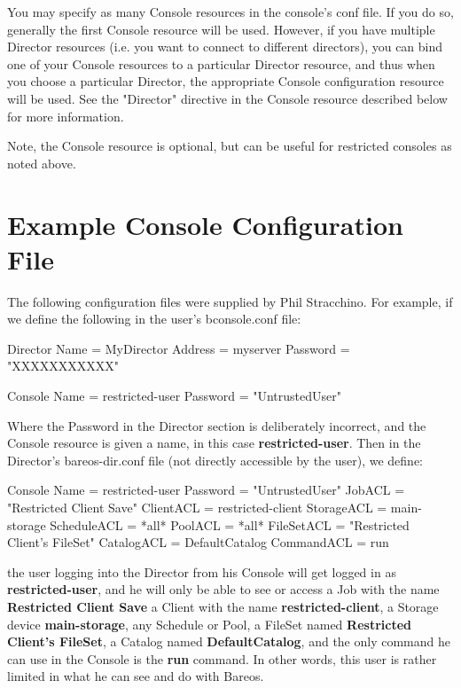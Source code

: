 You may specify as many Console resources in the console's conf file. If
you do so, generally the first Console resource will be used.  However, if
you have multiple Director resources (i.e. you want to connect to different
directors), you can bind one of your Console resources to a particular
Director resource, and thus when you choose a particular Director, the
appropriate Console configuration resource will be used. See the "Director"
directive in the Console resource described below for more information.

Note, the Console resource is optional, but can be useful for
restricted consoles as noted above.





\section{Example Console Configuration File}

The following configuration files were supplied by Phil Stracchino. For
example, if we define the following in the user's bconsole.conf file:

\begin{bconfig}{}
Director {
   Name = MyDirector
   Address = myserver
   Password = "XXXXXXXXXXX"
}

Console {
   Name = restricted-user
   Password = "UntrustedUser"
}
\end{bconfig}

Where the Password in the Director section is deliberately incorrect, and the
Console resource is given a name, in this case {\bf restricted-user}. Then
in the Director's bareos-dir.conf file (not directly accessible by the user),
we define:

\begin{bconfig}{}
Console {
  Name = restricted-user
  Password = "UntrustedUser"
  JobACL = "Restricted Client Save"
  ClientACL = restricted-client
  StorageACL = main-storage
  ScheduleACL = *all*
  PoolACL = *all*
  FileSetACL = "Restricted Client's FileSet"
  CatalogACL = DefaultCatalog
  CommandACL = run
}
\end{bconfig}


the user logging into the Director from his Console will get logged in as {\bf
restricted-user}, and he will only be able to see or access a Job with the
name {\bf Restricted Client Save} a Client with the name {\bf
restricted-client}, a Storage device {\bf main-storage}, any Schedule or Pool,
a FileSet named {\bf Restricted Client's FileSet}, a Catalog named {\bf
DefaultCatalog}, and the only command he can use in the Console is the {\bf
run} command. In other words, this user is rather limited in what he can see
and do with Bareos.

